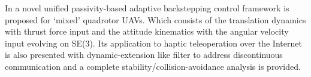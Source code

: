 In \cite{passivity-backstepping}  a novel unified passivity-based adaptive backstepping control framework is proposed for ‘mixed’ quadrotor UAVs. Which consists of the translation dynamics with thrust force input and the attitude kinematics with the angular velocity input evolving on SE(3). Its application to haptic teleoperation over the Internet is also presented with dynamic-extension like filter to address discontinuous communication and a complete stability/collision-avoidance analysis is provided.

\cite{passivity-based-formation-load}
\cite{passive-variable-impedance-compliant} 
\cite{max-wrench-min-energy} 
\cite{quadrotor-itneraction-environment} 
\cite{passivity-based-payload-minimum-swing} 
\cite{passivity-based-crop} 
\cite{payload-and-human}
\cite{door-opening}
\cite{passivity-based-physical-interaction}